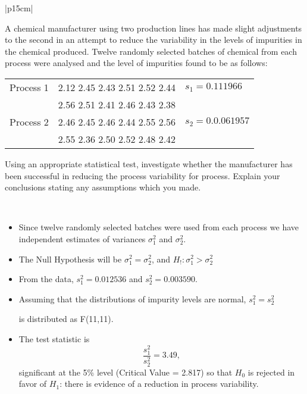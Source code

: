 \documentclass[a4paper,12pt]{article}
\begin{document}
\newpage
\large
\begin{table}[ht!]
 
\centering
 
\begin{tabular}{|p{15cm}|}
 
\hline  \large

\noindent A chemical manufacturer using two production lines has made slight adjustments to the second in an attempt to reduce the variability in the levels of impurities in the chemical produced.  Twelve randomly selected batches of chemical from each process were analysed and the level of impurities found to be as follows:

\begin{center}
\begin{tabular}{|c|c|l|} \hline
Process 1 & 2.12 2.45 2.43 2.51 2.52 2.44  & $s_1 = 0.111966$ \\& 2.56 2.51 2.41 2.46 2.43 2.38 &\\ \hline
Process 2 & 2.46 2.45 2.46 2.44 2.55 2.56  & $s_2 = 0.0.061957$\\& 2.55 2.36 2.50 2.52 2.48 2.42 &\\ \hline
\end{tabular}
\end{center}


Using an appropriate statistical test, investigate whether the manufacturer has been successful in reducing the process variability for process.  
Explain your conclusions  stating any assumptions which you made.

\\ \hline
  
\end{tabular}

\end{table}
\begin{itemize}
\item Since twelve randomly selected batches were used from each process we have independent estimates
of variances $\sigma^2_1$ and $\sigma^2_2$.
\item The Null Hypothesis will be $\sigma^2_1 = \sigma^2_2$, and $H_!: \sigma^2_1 > \sigma^2_2$


\item From the data, $s^2_1= 0.012536$ and $s^2_2= 0.003590$.
\item Assuming that the distributions of impurity levels are normal, $s^2_1=s^2_2$

is distributed as F(11,11).
\item The test statistic is \[ \frac{s^2_1}{s^2_2}
= 3.49,\]significant at the 5\% level (Critical Value = 2.817) so that $H_0$ is rejected in favor of $H_1$: there is evidence of a
reduction in process variability.
\end{itemize}
\end{document}
